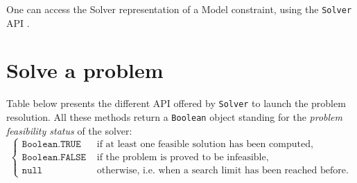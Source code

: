 One can access the Solver representation of a Model constraint, using the \texttt{Solver} API .

\section{Solve a problem}\label{solver:solveaproblem}\hypertarget{solver:solveaproblem}{}

Table below presents the different API offered by \texttt{Solver} to launch the problem resolution. All these methods return a \texttt{Boolean} object standing for the \emph{problem feasibility status} of the solver:
$$\begin{cases}
  \texttt{Boolean.TRUE} &\text{ if at least one feasible solution has been computed},\\
  \texttt{Boolean.FALSE} &\text{ if the problem is proved to be infeasible},\\
  \texttt{null} &\text{ otherwise, i.e. when a search limit has been reached before.}
\end{cases}$$

